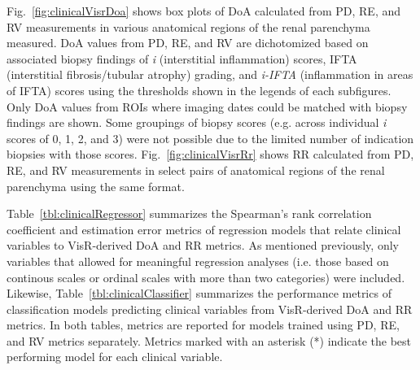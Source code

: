 Fig.~\ref{fig:clinicalVisrDoa} shows box plots of DoA calculated from PD, RE, and RV measurements in various anatomical regions of the renal parenchyma measured. DoA values from PD, RE, and RV are dichotomized based on associated biopsy findings of \emph{i} (interstitial inflammation) scores, IFTA (interstitial fibrosis/tubular atrophy) grading, and \emph{i-IFTA} (inflammation in areas of IFTA) scores using the thresholds shown in the legends of each subfigures. Only DoA values from ROIs where imaging dates could be matched with biopsy findings are shown. Some groupings of biopsy scores (e.g. across individual \emph{i} scores of 0, 1, 2, and 3) were not possible due to the limited number of indication biopsies with those scores. Fig.~\ref{fig:clinicalVisrRr} shows RR calculated from PD, RE, and RV measurements in select pairs of anatomical regions of the renal parenchyma using the same format.





Table~\ref{tbl:clinicalRegressor} summarizes the Spearman's rank correlation coefficient and estimation error metrics of regression models that relate clinical variables to VisR-derived DoA and RR metrics. As mentioned previously, only variables that allowed for meaningful regression analyses (i.e. those based on continous scales or ordinal scales with more than two categories) were included. Likewise, Table~\ref{tbl:clinicalClassifier} summarizes the performance metrics of classification models predicting clinical variables from VisR-derived DoA and RR metrics. In both tables, metrics are reported for models trained using PD, RE, and RV metrics separately. Metrics marked with an asterisk (*) indicate the best performing model for each clinical variable.

\afterpage{%
    \clearpage
    
    
    \clearpage
}
